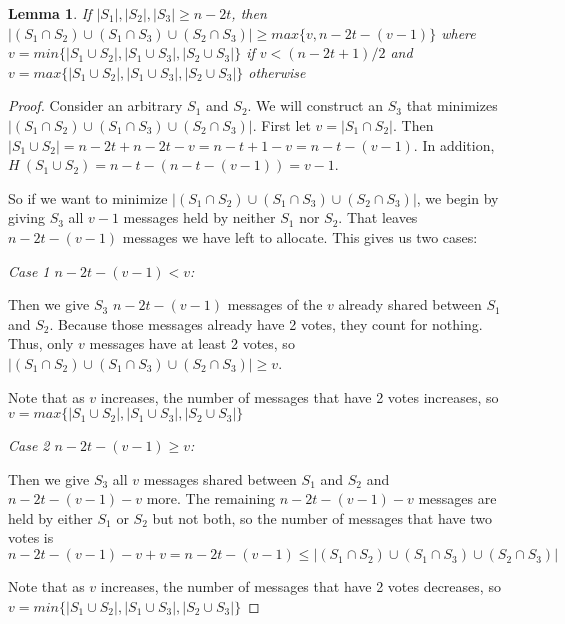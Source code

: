 \documentclass{article}
\newtheorem{lemma}{Lemma}
\begin{document}
\begin{lemma}
If $|S_1|, |S_2|, |S_3| \geq n - 2t$, then $|(S_1 \cap S_2) \cup (S_1 \cap S_3) \cup (S_2 \cap S_3)| \geq max\{v, n - 2t - (v - 1)\}$ where $v = min\{|S_1 \cup S_2|, |S_1 \cup S_3|, |S_2 \cup S_3|\}$ if $v < (n - 2t + 1) / 2$ and  $v = max\{|S_1 \cup S_2|, |S_1 \cup S_3|, |S_2 \cup S_3|\}$ otherwise
\end{lemma}

\begin{proof}
Consider an arbitrary $S_1$ and $S_2$. We will construct an $S_3$ that minimizes $|(S_1 \cap S_2) \cup (S_1 \cap S_3) \cup (S_2 \cap S_3)|$. First let $v = |S_1 \cap S_2|$. Then $|S_1 \cup S_2| = n - 2t + n - 2t - v = n - t + 1 - v = n - t - (v - 1)$. In addition, $H \ (S_1 \cup S_2) = n - t - (n - t - (v - 1)) = v - 1$.

So if we want to minimize $|(S_1 \cap S_2) \cup (S_1 \cap S_3) \cup (S_2 \cap S_3)|$, we begin by giving $S_3$ all $v - 1$ messages held by neither $S_1$ nor $S_2$. That leaves $n - 2t - (v - 1)$ messages we have left to allocate. This gives us two cases:

\emph{Case 1 $n - 2t - (v-1) < v$:}

Then we give $S_3$ $n - 2t - (v-1)$ messages of the $v$ already shared between $S_1$ and $S_2$. Because those messages already have 2 votes, they count for nothing. Thus, only $v$ messages have at least 2 votes, so $|(S_1 \cap S_2) \cup (S_1 \cap S_3) \cup (S_2 \cap S_3)| \geq v$.

Note that as $v$ increases, the number of messages that have 2 votes increases, so $v = max\{|S_1 \cup S_2|, |S_1 \cup S_3|, |S_2 \cup S_3|\}$

\emph{Case 2 $n - 2t - (v-1) \geq v$:}

Then we give $S_3$ all $v$ messages shared between $S_1$ and $S_2$ and $n - 2t - (v-1) - v$ more. The remaining $n - 2t - (v-1) - v$ messages are held by either $S_1$ or $S_2$ but not both, so the number of messages that have two votes is $n - 2t - (v - 1) - v + v = n - 2t - (v-1) \leq |(S_1 \cap S_2) \cup (S_1 \cap S_3) \cup (S_2 \cap S_3)|$

Note that as $v$ increases, the number of messages that have 2 votes decreases, so $v = min\{|S_1 \cup S_2|, |S_1 \cup S_3|, |S_2 \cup S_3|\}$

\end{proof}




\end{document}
